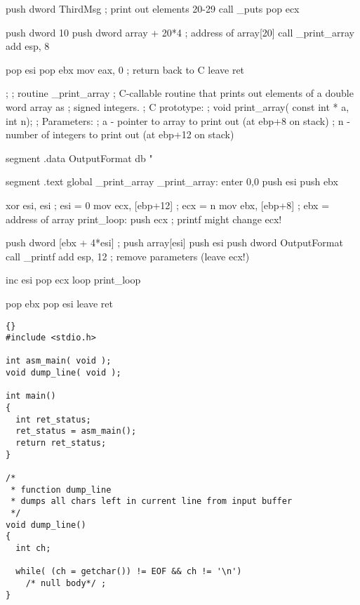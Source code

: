 \begin{AsmCodeListing}[label=array1.asm]
        push    dword ThirdMsg       ; print out elements 20-29
        call    _puts
        pop     ecx

        push    dword 10
        push    dword array + 20*4     ; address of array[20]
        call    _print_array
        add     esp, 8

        pop     esi
        pop     ebx
        mov     eax, 0            ; return back to C
        leave                     
        ret

;
; routine _print_array
; C-callable routine that prints out elements of a double word array as
; signed integers.
; C prototype:
; void print_array( const int * a, int n);
; Parameters:
;   a - pointer to array to print out (at ebp+8 on stack)
;   n - number of integers to print out (at ebp+12 on stack)

segment .data
OutputFormat    db   "%

segment .text
        global  _print_array
_print_array:
        enter   0,0
        push    esi
        push    ebx

        xor     esi, esi                  ; esi = 0
        mov     ecx, [ebp+12]             ; ecx = n
        mov     ebx, [ebp+8]              ; ebx = address of array
print_loop:
        push    ecx                       ; printf might change ecx!

        push    dword [ebx + 4*esi]       ; push array[esi]
        push    esi
        push    dword OutputFormat
        call    _printf
        add     esp, 12                   ; remove parameters (leave ecx!)

        inc     esi
        pop     ecx
        loop    print_loop

        pop     ebx
        pop     esi
        leave
        ret
\end{AsmCodeListing}

\begin{lstlisting}{}
#include <stdio.h>

int asm_main( void );
void dump_line( void );

int main()
{
  int ret_status;
  ret_status = asm_main();
  return ret_status;
}

/*
 * function dump_line
 * dumps all chars left in current line from input buffer
 */
void dump_line()
{
  int ch;

  while( (ch = getchar()) != EOF && ch != '\n')
    /* null body*/ ;
}
\end{lstlisting}


